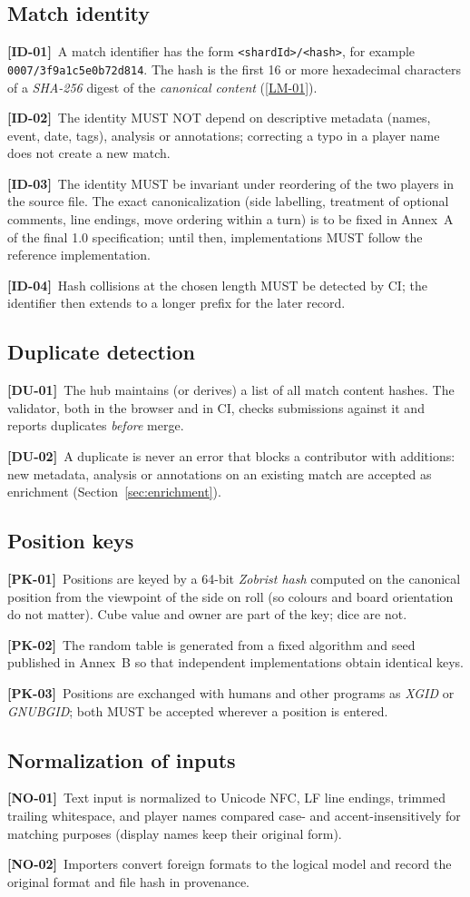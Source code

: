 \documentclass[11pt,a4paper]{article}
\newcommand{\kw}[1]{\textit{#1}\index{#1}}
\newcommand{\req}[2]{\par\smallskip\noindent\hypertarget{#1}{}\textbf{[#1]}\ #2\par}
\newcommand{\rref}[1]{\hyperlink{#1}{[#1]}}
\begin{document}
\subsection{Match identity}
\req{ID-01}{A match identifier has the form \texttt{<shardId>/<hash>}, for example \texttt{0007/3f9a1c5e0b72d814}. The hash is the first 16 or more hexadecimal characters of a \kw{SHA-256} digest of the \emph{canonical content} (\rref{LM-01}).}
\req{ID-02}{The identity MUST NOT depend on descriptive metadata (names, event, date, tags), analysis or annotations; correcting a typo in a player name does not create a new match.}
\req{ID-03}{The identity MUST be invariant under reordering of the two players in the source file. The exact canonicalization (side labelling, treatment of optional comments, line endings, move ordering within a turn) is to be fixed in Annex~A of the final 1.0 specification; until then, implementations MUST follow the reference implementation.}
\req{ID-04}{Hash collisions at the chosen length MUST be detected by CI; the identifier then extends to a longer prefix for the later record.}

\subsection{Duplicate detection}
\req{DU-01}{The hub maintains (or derives) a list of all match content hashes. The validator, both in the browser and in CI, checks submissions against it and reports duplicates \emph{before} merge.}
\req{DU-02}{A duplicate is never an error that blocks a contributor with additions: new metadata, analysis or annotations on an existing match are accepted as enrichment (Section~\ref{sec:enrichment}).}

\subsection{Position keys}
\req{PK-01}{Positions are keyed by a 64-bit \kw{Zobrist hash} computed on the canonical position from the viewpoint of the side on roll (so colours and board orientation do not matter). Cube value and owner are part of the key; dice are not.}
\req{PK-02}{The random table is generated from a fixed algorithm and seed published in Annex~B so that independent implementations obtain identical keys.}
\req{PK-03}{Positions are exchanged with humans and other programs as \kw{XGID} or \kw{GNUBGID}; both MUST be accepted wherever a position is entered.}

\subsection{Normalization of inputs}
\req{NO-01}{Text input is normalized to Unicode NFC, LF line endings, trimmed trailing whitespace, and player names compared case- and accent-insensitively for matching purposes (display names keep their original form).}
\req{NO-02}{Importers convert foreign formats to the logical model and record the original format and file hash in provenance.}
\end{document}
